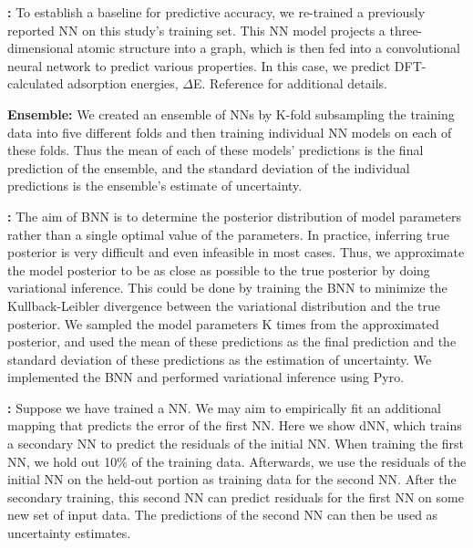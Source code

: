\documentclass[]{achemso}
\begin{document}
\textbf{:}
To establish a baseline for predictive accuracy, we re-trained a previously reported \gls{NN}\cite{Xie2018, Back2019} on this study's training set.
This \gls{NN} model projects a three-dimensional atomic structure into a graph, which is then fed into a convolutional neural network to predict various properties.
In this case, we predict \gls{DFT}-calculated adsorption energies, $\Delta$E.
Reference \citet{Back2019} for additional details.

\textbf{ Ensemble:}
We created an ensemble of \gls{NN}s by K-fold subsampling the training data into five different folds and then training individual \gls{NN} models on each of these folds.
Thus the mean of each of these models' predictions is the final prediction of the ensemble, and the standard deviation of the individual predictions is the ensemble's estimate of uncertainty.

\textbf{:}
The aim of \gls{BNN} is to determine the posterior distribution of model parameters rather than a single optimal value of the parameters.
In practice, inferring true posterior is very difficult and even infeasible in most cases.
Thus, we approximate the model posterior to be as close as possible to the true posterior by doing variational inference.
This could be done by training the \gls{BNN} to minimize the Kullback-Leibler divergence between the variational distribution and the true posterior.
We sampled the model parameters K times from the approximated posterior, and used the mean of these predictions as the final prediction and the standard deviation of these predictions as the estimation of uncertainty.
We implemented the \gls{BNN} and performed variational inference using Pyro.\cite{Bingham2018}

\textbf{:}
Suppose we have trained a \gls{NN}.
We may aim to empirically fit an additional mapping that predicts the error of the first \gls{NN}.
Here we show \gls{dNN}, which trains a secondary \gls{NN} to predict the residuals of the initial \gls{NN}.
When training the first \gls{NN}, we hold out 10\% of the training data.
Afterwards, we use the residuals of the initial \gls{NN} on the held-out portion as training data for the second \gls{NN}.
After the secondary training, this second \gls{NN} can predict residuals for the first \gls{NN} on some new set of input data.
The predictions of the second \gls{NN} can then be used as uncertainty estimates.
\end{document}
